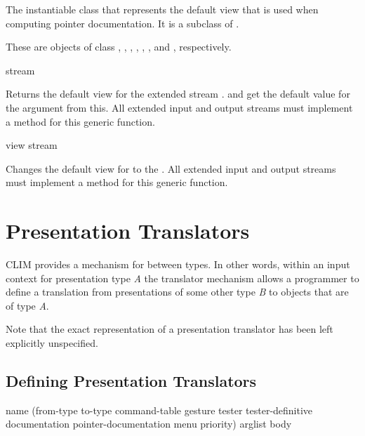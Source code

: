 
The instantiable class that represents the default view that is used when
computing pointer documentation.  It is a subclass of .


These are objects of class , ,
, , ,
, and , respectively.

 {stream}

Returns the default view for the extended stream .   and
 get the default value for the  argument from this.  All
extended input and output streams must implement a method for this generic
function.

 {view stream}

Changes the default view for  to the  .  All
extended input and output streams must implement a method for this generic
function.


\section {Presentation Translators}

CLIM provides a mechanism for  between types.  In other
words, within an input context for presentation type {\it A} the translator
mechanism allows a programmer to define a translation from presentations of some
other type {\it B} to objects that are of type {\it A}.

Note that the exact representation of a presentation translator has been left
explicitly unspecified.


\subsection {Defining Presentation Translators}

 {name
                                            (from-type to-type command-table
                                             \key gesture
                                                  tester tester-definitive
                                                  documentation pointer-documentation
                                                  menu priority)
                                            arglist
                                            \body body}

